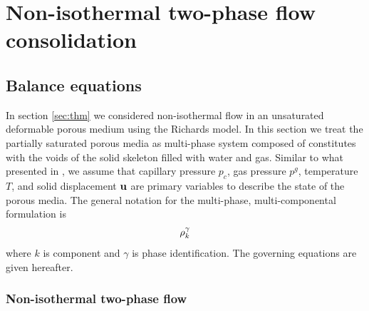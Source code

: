 \chapter{Non-isothermal two-phase flow consolidation}
\label{sec:th2m}

\section{Balance equations}

In section \ref{sec:thm} we considered non-isothermal flow in an unsaturated deformable porous medium using the Richards model.
In this section we treat the partially saturated porous media as multi-phase system composed of constitutes with
the voids of the solid skeleton filled with water and gas. Similar to what presented in \cite{SanPesSch:06}, we assume that
capillary pressure $p_c$, gas pressure $p^g$, temperature $T$, and solid displacement $\mathbf u$ are primary variables
to describe the state of the porous media. The general notation for the multi-phase, multi-componental formulation is
\begin{align}
\rho_k^\gamma
\end{align}
where
$k$ is component and $\gamma$ is phase identification.
The governing equations are given hereafter.

\subsection{Non-isothermal two-phase flow}

